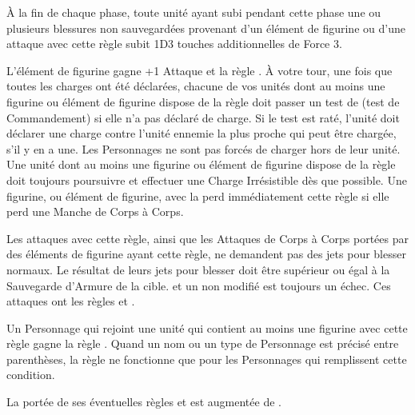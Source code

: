 
À la fin de chaque phase, toute unité ayant subi pendant cette phase une ou plusieurs blessures non sauvegardées provenant d'un élément de figurine ou d'une attaque avec cette règle subit 1D3 touches additionnelles de Force 3.


L'élément de figurine gagne +1 Attaque et la règle \immunetopsychology{}. À votre tour, une fois que toutes les charges ont été déclarées, chacune de vos unités dont au moins une figurine ou élément de figurine dispose de la règle \frenzy{} doit passer un test de \frenzy{} (test de Commandement) si elle n'a pas déclaré de charge. Si le test est raté, l'unité doit déclarer une charge contre l'unité ennemie la plus proche qui peut être chargée, s'il y en a une. Les Personnages ne sont pas forcés de charger hors de leur unité. Une unité dont au moins une figurine ou élément de figurine dispose de la règle \frenzy{} doit toujours poursuivre et effectuer une Charge Irrésistible dès que possible. Une figurine, ou élément de figurine, avec la \frenzy{} perd immédiatement cette règle si elle perd une Manche de Corps à Corps.


Les attaques avec cette règle, ainsi que les Attaques de Corps à Corps portées par des éléments de figurine ayant cette règle, ne demandent pas des jets pour blesser normaux. Le résultat de leurs jets pour blesser doit être supérieur ou égal à la Sauvegarde d'Armure de la cible.  et un  non modifié est toujours un échec. Ces attaques ont les règles \flamingattacks{} et .


Un Personnage qui rejoint une unité qui contient au moins une figurine avec cette règle gagne la règle \stubborn{}. Quand un nom ou un type de Personnage est précisé entre parenthèses, la règle ne fonctionne que pour les Personnages qui remplissent cette condition.


 La portée de ses éventuelles règles \inspiringpresence{} et \holdyourground{} est augmentée de .

